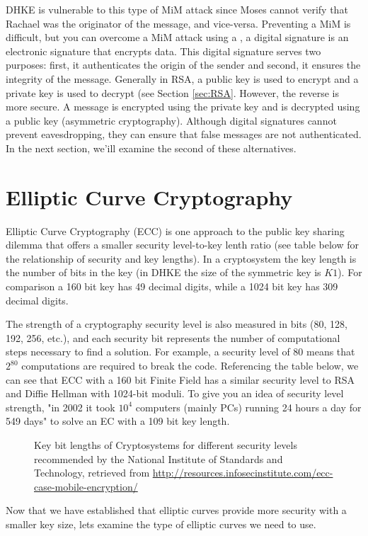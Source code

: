 DHKE is vulnerable to this type of MiM attack since Moses cannot verify that Rachael was the originator of the message, and vice-versa.  Preventing a MiM is difficult, but you can overcome a MiM attack using a , a digital signature is an electronic signature that encrypts data.  This digital signature serves two purposes: first, it authenticates the origin of the sender and second, it ensures the integrity of the message.  Generally in RSA, a public key is used to encrypt and a private key is used to decrypt (see Section \ref{sec:RSA}.  However, the reverse is more secure.  A message is encrypted using the private key and is decrypted using a public key (asymmetric cryptography). Although digital signatures cannot prevent eavesdropping, they can ensure that false messages are not authenticated. In the next section, we'ill examine the second of these alternatives. 

\section{Elliptic Curve Cryptography}\label{sec:ECC:2}

Elliptic Curve Cryptography (ECC) is one approach to the public key sharing dilemma that offers a smaller security level-to-key lenth ratio (see table below for the relationship  of security and key lengths).  In a cryptosystem the key length is the number of bits in the key (in DHKE the size of the symmetric key is $K1$).  For comparison a 160 bit key has 49 decimal digits, while a 1024 bit key has 309 decimal digits. 

The strength of a cryptography security level is also measured in bits (80, 128, 192, 256, etc.), and each security bit represents the number of computational steps necessary to find a solution.  For example, a security level of 80 means that $2^{80}$ computations are required to break the code. Referencing the table below, we can see that ECC with a 160 bit Finite Field has a similar security level to RSA and Diffie Hellman with 1024-bit moduli. To give you an idea of security level strength, "in 2002 it took $10^4$ computers (mainly PCs) running 24 hours a day for 549 days" to solve an EC with a 109 bit key length. 
\begin{figure} [H]
	  \caption{\label{fig:DH:DHKE_9} Key bit lengths of Cryptosystems for different security levels recommended by the National Institute of Standards and Technology, retrieved from 
\url{http://resources.infosecinstitute.com/ecc-case-mobile-encryption/}}
\end{figure}
Now that we have established that elliptic curves provide more security with a smaller key size, lets examine the type of elliptic curves we need to use.

